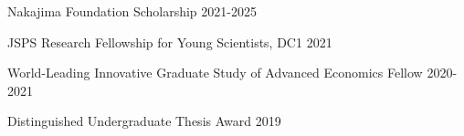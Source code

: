 

\begin{cventries}

\cventrysimple
    {Nakajima Foundation Scholarship}  %
    {2021-2025} %
    {}
	
\cventrysimple
	{JSPS Research Fellowship for Young Scientists, DC1}  %
    {2021} %
    {}

\cventrysimple
	{World-Leading Innovative Graduate Study of Advanced Economics Fellow}  %
    {2020-2021} %
    {}

\cventrysimple
    {Distinguished Undergraduate Thesis Award}  %
    {2019} %
    {}


\end{cventries}
